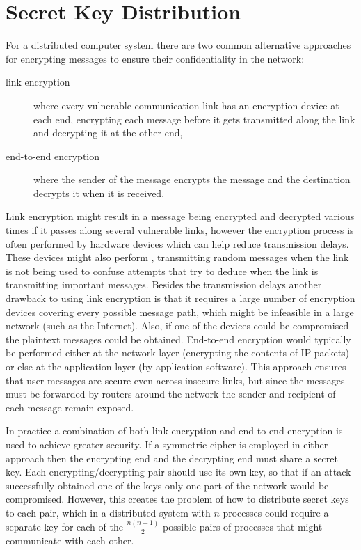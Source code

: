 
\section{Secret Key Distribution}\label{Se:SecretKeyDistribution}

For a distributed computer system there are two common alternative approaches
for encrypting messages to ensure their confidentiality in the network:
\begin{description}
  \item[link encryption] where every vulnerable communication link has an
  encryption device at each end, encrypting each message before it gets
  transmitted along the link and decrypting it at the other end,
  \item[end-to-end encryption] where the sender of the message encrypts the
  message and the destination decrypts it when it is received.
\end{description}
Link encryption might result in a message being encrypted and decrypted
various times if it passes along several vulnerable links, however the
encryption process is often performed by hardware devices which can help
reduce transmission delays.
These devices might also perform , transmitting
random messages when the link is not being used to confuse attempts that try
to deduce when the link is transmitting important messages.
Besides the transmission delays another drawback to using link encryption
is that it requires a large number of encryption devices
covering every possible message path, which might be infeasible in a large network
(such as the Internet). Also, if one of the devices could be compromised
the plaintext messages could be obtained.
End-to-end encryption would typically be performed either at the network layer
(encrypting the contents of IP packets) or else at the application layer
(by application software). This approach ensures that user messages
are secure even across insecure links, but since the messages must be forwarded
by routers around the network the sender and recipient of each message
remain exposed.

In practice a combination of both link encryption and end-to-end encryption is
used to achieve greater security.
If a symmetric cipher is employed in either approach then the encrypting end
and the decrypting end must share a secret key. Each encrypting/decrypting
pair should use its own key, so that if an attack successfully obtained one of the keys
only one part of the network would be compromised.
However, this creates the problem of how to distribute secret keys to each pair,
which in a distributed system with $n$ processes could require a separate key
for each of the $\frac{n(n-1)}{2}$ possible pairs of processes that might communicate
with each other.

